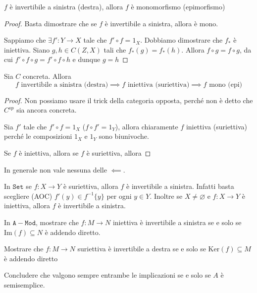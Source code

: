 \begin{proposition}{}
    \(f\) è invertibile a sinistra (destra), allora \(f\) è monomorfismo
    (epimorfismo)
\end{proposition}
\begin{proof}{}
    Basta dimostrare che se \(f\) è invertibile a sinistra, allora è mono.

    Sappiamo che \(\exists f' : Y\to X\) tale che \(f' \circ f = 1_X\). Dobbiamo
    dimostrare che \(f_*\) è iniettiva. Siano \(g, h \in C{(Z, X)}\) tali che \(f_*{(g)} = f_*{(h)}\). Allora \(f \circ g = f \circ g\), da cui \(f' \circ f \circ g = f' \circ f \circ h\) e dunque \(g = h\) 
\end{proof}

\begin{proposition}{}
    Sia \(C\) concreta. Allora
    \[
      f \text{ invertibile a sinistra (destra)} \implies f \text{ iniettiva
      (suriettiva)} \implies f \text{ mono (epi)}
    \]
\end{proposition}
\begin{proof}{}
    Non possiamo usare il trick della categoria opposta, perché non è detto che
    \(C^{op}\) sia ancora concreta.

    Sia \(f'\) tale che \(f' \circ f = 1_X\) (\(f \circ f' = 1_Y\)), allora
    chiaramente \(f\) iniettiva (suriettiva) perché le composizioni \(1_X\) e \(1_Y\) sono biunivoche.

    Se \(f\) è iniettiva, allora %
    se \(f\) è suriettiva, allora %
\end{proof}

In generale non vale nessuna delle \(\impliedby\).
\begin{example}{}
    In \(\mathtt{Set}\) se \(f : X \to Y\) è suriettiva, allora \(f\) è invertibile a
    sinistra. Infatti basta scegliere (AOC) \(f'{(y)} \in f^{-1}\{y\} \) per
    ogni \(y \in Y\). Inoltre se \(X \neq \varnothing\) e \(f : X \to Y\) è
    iniettiva, allora \(f\) è invertibile a sinistra.
\end{example}

\begin{eser}{}
    In \(\mathtt{A-Mod}\), mostrare che \(f : M\to N\) iniettiva è invertibile a
    sinistra se e solo se \(\mathrm{Im}{(f)} \subseteq N \) è addendo diretto.

    Mostrare che \(f : M \to N\) suriettiva è invertibile a destra se e solo se
    \(\mathrm{Ker}{(f)} \subseteq M \) è addendo diretto

    Concludere che valgono sempre entrambe le implicazioni se e solo se \(A\) è
    semisemplice.
\end{eser}

